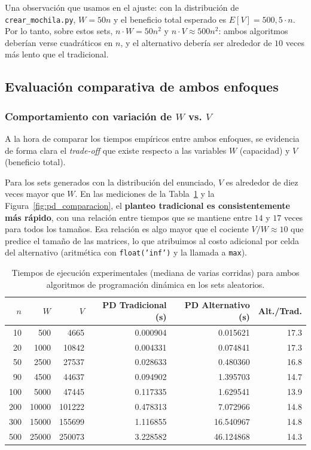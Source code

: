 \documentclass[11pt,a4paper]{article}
\begin{document}
Una observación que usamos en el ajuste: con la distribución de \texttt{crear\_mochila.py}, $W = 50n$ y el beneficio total esperado es $E[V] = 500{,}5 \cdot n$. Por lo tanto, sobre estos sets, $n \cdot W = 50n^2$ y $n \cdot V \approx 500n^2$: ambos algoritmos deberían verse cuadráticos en $n$, y el alternativo debería ser alrededor de $10$ veces más lento que el tradicional.

\subsection{Evaluación comparativa de ambos enfoques}

\subsubsection{Comportamiento con variación de \texorpdfstring{$W$}{W} vs. \texorpdfstring{$V$}{V}}
A la hora de comparar los tiempos empíricos entre ambos enfoques, se evidencia de forma clara el \textit{trade-off} que existe respecto a las variables $W$ (capacidad) y $V$ (beneficio total).

Para los sets generados con la distribución del enunciado, $V$ es alrededor de diez veces mayor que $W$. En las mediciones de la Tabla~\ref{tab:tabla_pd_tiempos} y la Figura~\ref{fig:pd_comparacion}, el \textbf{planteo tradicional es consistentemente más rápido}, con una relación entre tiempos que se mantiene entre $14$ y $17$ veces para todos los tamaños. Esa relación es algo mayor que el cociente $V/W \approx 10$ que predice el tamaño de las matrices, lo que atribuimos al costo adicional por celda del alternativo (aritmética con \texttt{float('inf')} y la llamada a \texttt{max}).

\begin{table}[H]
    \centering
    \begin{tabular}{rrrrrr}
        \toprule
        \textbf{$n$} & \textbf{$W$} & \textbf{$V$} & \textbf{PD Tradicional (s)} & \textbf{PD Alternativo (s)} & \textbf{Alt./Trad.} \\
        \midrule
        10  & 500   & 4665   & 0.000904 & 0.015621  & 17.3 \\
        20  & 1000  & 10842  & 0.004331 & 0.074841  & 17.3 \\
        50  & 2500  & 27537  & 0.028633 & 0.480360  & 16.8 \\
        90  & 4500  & 44637  & 0.094902 & 1.395703  & 14.7 \\
        100 & 5000  & 47445  & 0.117335 & 1.629541  & 13.9 \\
        200 & 10000 & 101222 & 0.478313 & 7.072966  & 14.8 \\
        300 & 15000 & 155699 & 1.116855 & 16.540967 & 14.8 \\
        500 & 25000 & 250073 & 3.228582 & 46.124868 & 14.3 \\
        \bottomrule
    \end{tabular}
    \caption{Tiempos de ejecución experimentales (mediana de varias corridas) para ambos algoritmos de programación dinámica en los sets aleatorios.}
    \label{tab:tabla_pd_tiempos}
\end{table}
\end{document}
